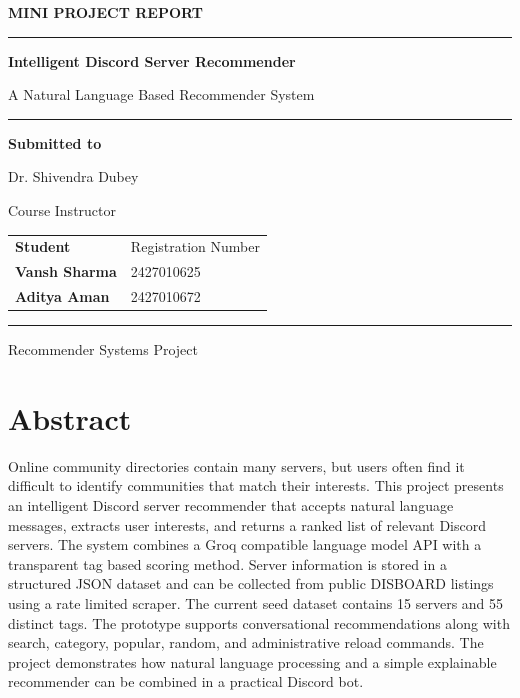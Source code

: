 \documentclass[11pt,a4paper]{article}
\begin{document}
\begin{titlepage}
    \thispagestyle{empty}
    \centering
    \vspace*{1.0cm}
    {\large\bfseries\color{burgundy} MINI PROJECT REPORT\par}
    \vspace{0.55cm}
    \rule{0.82\textwidth}{0.8pt}\par
    \vspace{0.55cm}
    {\LARGE\bfseries\color{navy} Intelligent Discord Server Recommender\par}
    \vspace{0.25cm}
    {\large A Natural Language Based Recommender System\par}
    \vspace{1.1cm}
    \rule{0.35\textwidth}{1.5pt}\par
    \vspace{1.0cm}
    {\large\bfseries Submitted to\par}
    \vspace{0.2cm}
    {\Large Dr. Shivendra Dubey\par}
    \vspace{0.2cm}
    {\large Course Instructor\par}
    \vfill
    \begin{tabular}{>{\bfseries}p{} p{}}
        Student & Registration Number \\
        Vansh Sharma & 2427010625 \\
        Aditya Aman & 2427010672 \\
    \end{tabular}
    \vspace{1.0cm}

    \rule{0.82\textwidth}{0.8pt}\par
    \vspace{0.25cm}
    {\large Recommender Systems Project\par}
\end{titlepage}

\section*{Abstract}
Online community directories contain many servers, but users often find it difficult to identify communities that match their interests. This project presents an intelligent Discord server recommender that accepts natural language messages, extracts user interests, and returns a ranked list of relevant Discord servers. The system combines a Groq compatible language model API with a transparent tag based scoring method. Server information is stored in a structured JSON dataset and can be collected from public DISBOARD listings using a rate limited scraper. The current seed dataset contains 15 servers and 55 distinct tags. The prototype supports conversational recommendations along with search, category, popular, random, and administrative reload commands. The project demonstrates how natural language processing and a simple explainable recommender can be combined in a practical Discord bot.
\end{document}
